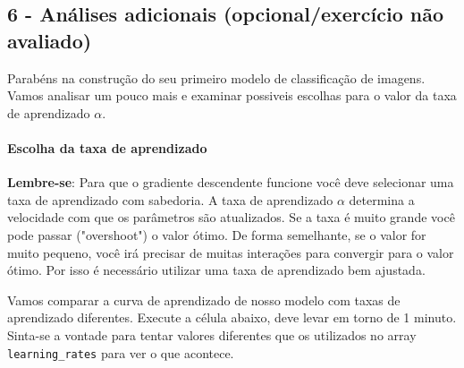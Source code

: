 \documentclass[11pt]{article}
\begin{document}
    \subsection{6 - Análises adicionais (opcional/exercício não
avaliado)}\label{anuxe1lises-adicionais-opcionalexercuxedcio-nuxe3o-avaliado}

Parabéns na construção do seu primeiro modelo de classificação de
imagens. Vamos analisar um pouco mais e examinar possiveis escolhas para
o valor da taxa de aprendizado \(\alpha\).

    \paragraph{Escolha da taxa de
aprendizado}\label{escolha-da-taxa-de-aprendizado}

\textbf{Lembre-se}: Para que o gradiente descendente funcione você deve
selecionar uma taxa de aprendizado com sabedoria. A taxa de aprendizado
\(\alpha\) determina a velocidade com que os parâmetros são atualizados.
Se a taxa é muito grande você pode passar ("overshoot") o valor ótimo.
De forma semelhante, se o valor for muito pequeno, você irá precisar de
muitas interações para convergir para o valor ótimo. Por isso é
necessário utilizar uma taxa de aprendizado bem ajustada.

Vamos comparar a curva de aprendizado de nosso modelo com taxas de
aprendizado diferentes. Execute a célula abaixo, deve levar em torno de
1 minuto. Sinta-se a vontade para tentar valores diferentes que os
utilizados no array \texttt{learning\_rates} para ver o que acontece.
\end{document}
